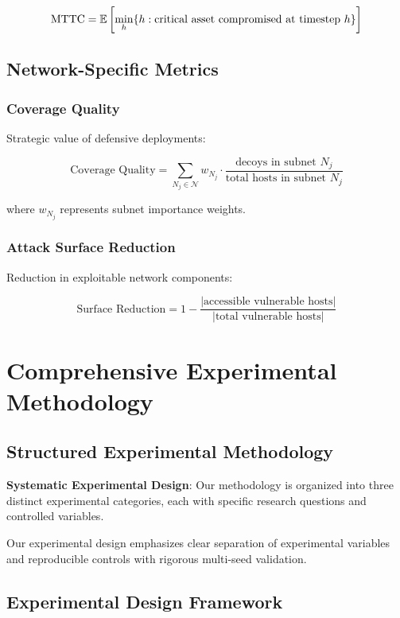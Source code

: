 \documentclass[12pt,oneside,a4paper]{article}
\theoremstyle{definition}
\theoremstyle{plain}
\begin{document}
\begin{equation}
\text{MTTC} = \mathbb{E}\left[\min_h \{h : \text{critical asset compromised at timestep } h\}\right]
\end{equation}

\subsection{Network-Specific Metrics}

\subsubsection{Coverage Quality}
Strategic value of defensive deployments:

\begin{equation}
\text{Coverage Quality} = \sum_{N_j \in \mathcal{N}} w_{N_j} \cdot \frac{\text{decoys in subnet } N_j}{\text{total hosts in subnet } N_j}
\end{equation}

where $w_{N_j}$ represents subnet importance weights.

\subsubsection{Attack Surface Reduction}
Reduction in exploitable network components:

\begin{equation}
\text{Surface Reduction} = 1 - \frac{|\text{accessible vulnerable hosts}|}{|\text{total vulnerable hosts}|}
\end{equation}

\section{Comprehensive Experimental Methodology}

\subsection{Structured Experimental Methodology}

\textbf{Systematic Experimental Design}: Our methodology is organized into three distinct experimental categories, each with specific research questions and controlled variables.

Our experimental design emphasizes clear separation of experimental variables and reproducible controls with rigorous multi-seed validation.

\subsection{Experimental Design Framework}
\end{document}
